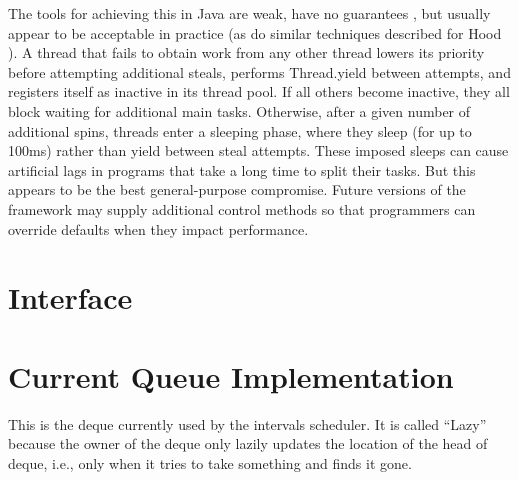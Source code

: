 The tools for achieving this in Java are weak, have no guarantees
\cite{Goetz2006}, but usually appear to be acceptable in practice (as
do similar techniques described for Hood \cite{Blumofe1998}). A thread
that fails to obtain work from any other thread lowers its priority
before attempting additional steals, performs Thread.yield between
attempts, and registers itself as inactive in its thread pool. If all
others become inactive, they all block waiting for additional main
tasks. Otherwise, after a given number of additional spins, threads
enter a sleeping phase, where they sleep (for up to 100ms) rather than
yield between steal attempts. These imposed sleeps can cause
artificial lags in programs that take a long time to split their
tasks. But this appears to be the best general-purpose
compromise. Future versions of the framework may supply additional
control methods so that programmers can override defaults when they
impact performance.

\section{Interface}
\label{sec:queues-description-interface}




\section{Current Queue Implementation}
\label{sec:queues-description-current-implementation}

This is the deque currently used by the intervals scheduler. It is
called ``Lazy'' because the owner of the deque only lazily updates the
location of the head of deque, i.e., only when it tries to take
something and finds it gone.




    
